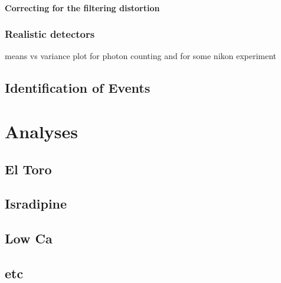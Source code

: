 \documentclass[a4paper,11pt,]{article}
\begin{document}
\paragraph{Correcting for the filtering distortion} \lipsum[1]

\subsubsection{Realistic detectors}

means vs variance plot for photon counting and for some nikon experiment

\subsection{Identification of Events}

\newpage

\section{Analyses}
\subsection{El Toro}
\subsection{Isradipine}
\subsection{Low Ca}
\subsection{etc}


\end{document}
